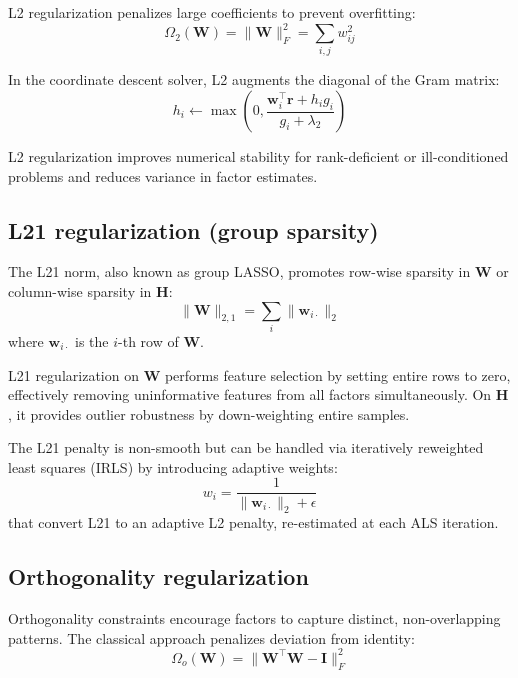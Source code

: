 \documentclass[article]{jss_modified}
\begin{document}
L2 regularization penalizes large coefficients to prevent overfitting:
\begin{equation}
  \Omega_2(\mathbf{W}) = \|\mathbf{W}\|_F^2 = \sum_{i,j} w_{ij}^2
\end{equation}

In the coordinate descent solver, L2 augments the diagonal of the Gram matrix:
\begin{equation}
  h_i \leftarrow \max\left(0, \frac{\mathbf{w}_i^\top\mathbf{r} + h_i g_i}{g_i + 
  \lambda_2}\right)
\end{equation}

L2 regularization improves numerical stability for rank-deficient or 
ill-conditioned problems and reduces variance in factor estimates.

\subsection{L21 regularization (group sparsity)}

The L21 norm, also known as group LASSO, promotes row-wise sparsity in 
$\mathbf{W}$ or column-wise sparsity in $\mathbf{H}$:
\begin{equation}
  \|\mathbf{W}\|_{2,1} = \sum_{i} \|\mathbf{w}_{i\cdot}\|_2
\end{equation}
where $\mathbf{w}_{i\cdot}$ is the $i$-th row of $\mathbf{W}$.

L21 regularization on $\mathbf{W}$ performs feature selection by setting entire 
rows to zero, effectively removing uninformative features from all factors 
simultaneously. On $\mathbf{H}$, it provides outlier robustness by down-weighting 
entire samples.

The L21 penalty is non-smooth but can be handled via iteratively reweighted 
least squares (IRLS) by introducing adaptive weights:
\begin{equation}
  w_i = \frac{1}{\|\mathbf{w}_{i\cdot}\|_2 + \epsilon}
\end{equation}
that convert L21 to an adaptive L2 penalty, re-estimated at each ALS iteration.

\subsection{Orthogonality regularization}

Orthogonality constraints encourage factors to capture distinct, non-overlapping 
patterns. The classical approach penalizes deviation from identity:
\begin{equation}
  \Omega_o(\mathbf{W}) = \|\mathbf{W}^\top\mathbf{W} - \mathbf{I}\|_F^2
\end{equation}
\end{document}
